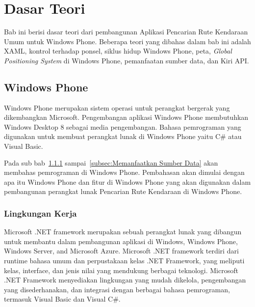 \chapter{Dasar Teori}
\label{chap:teori}
Bab ini berisi dasar teori dari pembangunan Aplikasi Pencarian Rute Kendaraan Umum untuk Windows Phone. Beberapa teori yang dibahas dalam bab ini  adalah XAML, kontrol terhadap ponsel, siklus hidup Windows Phone, peta, \textit{Global Positioning System} di Windows Phone, pemanfaatan sumber data, dan Kiri API. 

\section{Windows Phone}
\label{sec:Windows Phone}
\hspace{0.5cm} Windows Phone merupakan sistem operasi untuk perangkat bergerak yang dikembangkan Microsoft\footnotemark[1]. Pengembangan aplikasi Windows Phone membutuhkan Windows Desktop 8 sebagai media pengembangan. Bahasa pemrograman yang digunakan untuk membuat perangkat lunak di Windows Phone yaitu C\# atau Visual Basic.  

\hspace{0.5cm} Pada sub bab~\ref{subsec:Lingkungan Kerja} sampai~\ref{subsec:Memanfaatkan Sumber Data} akan membahas pemrograman di Windows Phone. Pembahasan akan dimulai dengan apa itu Windows Phone dan fitur di Windows Phone yang akan digunakan dalam pembangunan perangkat lunak Pencarian Rute Kendaraan di Windows Phone. 

\subsection{Lingkungan Kerja}
\label{subsec:Lingkungan Kerja}
\hspace{0.5cm} Microsoft .NET framework merupakan sebuah perangkat lunak yang dibangun untuk membantu dalam pembangunan aplikasi di Windows, Windows Phone, Windows Server, and Microsoft Azure\cite{MSDN}. Microsoft .NET framework terdiri dari runtime bahasa umum dan perpustakaan kelas .NET Framework, yang meliputi kelas, interface, dan jenis nilai yang mendukung berbagai teknologi. Microsoft .NET Framework menyediakan lingkungan yang mudah dikelola, pengembangan yang disederhanakan, dan integrasi dengan berbagai bahasa pemrograman, termasuk Visual Basic dan Visual C\#.

